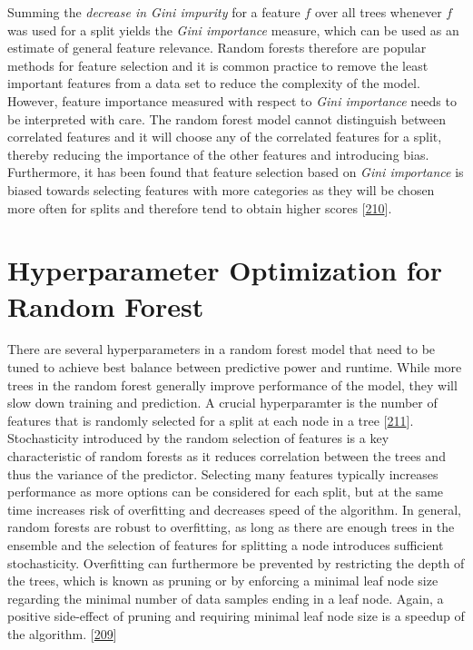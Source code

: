 \documentclass[11pt,a4paper,twoside]{book}
\theoremstyle{definition}
\theoremstyle{definition}
\theoremstyle{remark}
\begin{document}
Summing the \emph{decrease in Gini impurity} for a feature \(f\) over
all trees whenever \(f\) was used for a split yields the \emph{Gini
importance} measure, which can be used as an estimate of general feature
relevance. Random forests therefore are popular methods for feature
selection and it is common practice to remove the least important
features from a data set to reduce the complexity of the model. However,
feature importance measured with respect to \emph{Gini importance} needs
to be interpreted with care. The random forest model cannot distinguish
between correlated features and it will choose any of the correlated
features for a split, thereby reducing the importance of the other
features and introducing bias. Furthermore, it has been found that
feature selection based on \emph{Gini importance} is biased towards
selecting features with more categories as they will be chosen more
often for splits and therefore tend to obtain higher scores
{[}\protect\hyperlink{ref-Strobl2007}{210}{]}.

\section{Hyperparameter Optimization for Random
Forest}\label{hyperparameter-optimization-for-random-forest}

There are several hyperparameters in a random forest model that need to
be tuned to achieve best balance between predictive power and runtime.
While more trees in the random forest generally improve performance of
the model, they will slow down training and prediction. A crucial
hyperparamter is the number of features that is randomly selected for a
split at each node in a tree
{[}\protect\hyperlink{ref-Bernard2009}{211}{]}. Stochasticity introduced
by the random selection of features is a key characteristic of random
forests as it reduces correlation between the trees and thus the
variance of the predictor. Selecting many features typically increases
performance as more options can be considered for each split, but at the
same time increases risk of overfitting and decreases speed of the
algorithm. In general, random forests are robust to overfitting, as long
as there are enough trees in the ensemble and the selection of features
for splitting a node introduces sufficient stochasticity. Overfitting
can furthermore be prevented by restricting the depth of the trees,
which is known as pruning or by enforcing a minimal leaf node size
regarding the minimal number of data samples ending in a leaf node.
Again, a positive side-effect of pruning and requiring minimal leaf node
size is a speedup of the algorithm.
{[}\protect\hyperlink{ref-Louppe2014}{209}{]}
\end{document}
